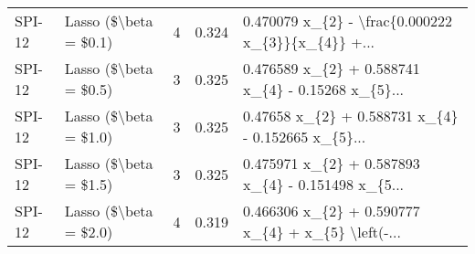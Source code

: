 \begin{tabular}{llrrl}
 SPI-12 & Lasso (\$\textbackslash beta = \$0.1) &         4 & 0.324 & 0.470079 x\_\{2\} - \textbackslash frac\{0.000222 x\_\{3\}\}\{x\_\{4\}\} +... \\
 SPI-12 & Lasso (\$\textbackslash beta = \$0.5) &         3 & 0.325 & 0.476589 x\_\{2\} + 0.588741 x\_\{4\} - 0.15268 x\_\{5\}... \\
 SPI-12 & Lasso (\$\textbackslash beta = \$1.0) &         3 & 0.325 & 0.47658 x\_\{2\} + 0.588731 x\_\{4\} - 0.152665 x\_\{5\}... \\
 SPI-12 & Lasso (\$\textbackslash beta = \$1.5) &         3 & 0.325 & 0.475971 x\_\{2\} + 0.587893 x\_\{4\} - 0.151498 x\_\{5... \\
 SPI-12 & Lasso (\$\textbackslash beta = \$2.0) &         4 & 0.319 & 0.466306 x\_\{2\} + 0.590777 x\_\{4\} + x\_\{5\} \textbackslash left(-... \\
\bottomrule
\end{tabular}
